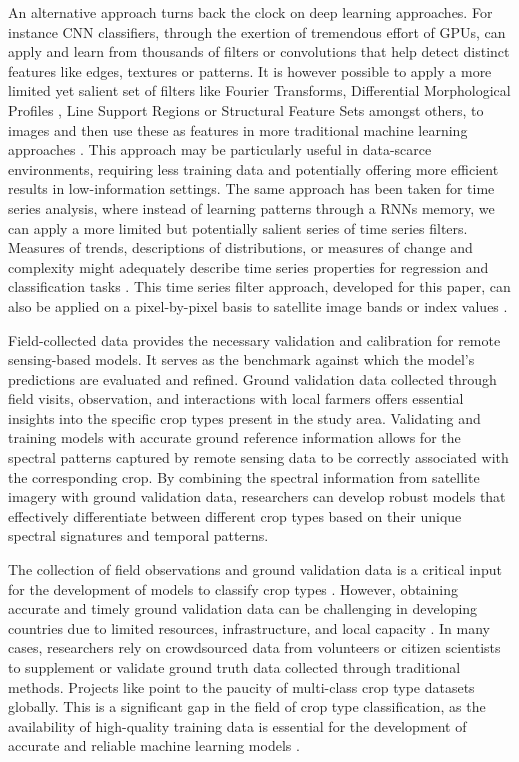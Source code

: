 \documentclass[journal]{IEEEtran}
\begin{document}
An alternative approach turns back the clock on deep learning approaches. For instance CNN classifiers, through the exertion of tremendous effort of GPUs, can apply and learn from thousands of filters or convolutions that help detect distinct features like edges, textures or patterns. It is however possible to apply a more limited yet salient set of filters like Fourier Transforms, Differential Morphological Profiles \cite{pesaresi2001new}, Line Support Regions or Structural Feature Sets \cite{huang2007classification} amongst others, to images and then use these as features in more traditional machine learning approaches \cite{graesser2012image, owusu2024towards, engstrom2022poverty, chao2021evaluating, urbansci7040116}. This approach may be particularly useful in data-scarce environments, requiring less training data and potentially offering more efficient results in low-information settings. The same approach has been taken for time series analysis, where instead of learning patterns through a RNNs memory, we can apply a more limited but potentially salient series of time series filters. Measures of trends, descriptions of distributions, or measures of change and complexity might adequately describe time series properties for regression and classification tasks \cite{christ2018time, yang2021anomaly}. This time series filter approach, developed for this paper, can also be applied on a pixel-by-pixel basis to satellite image bands or index values \cite{xr_fresh_2021}.

Field-collected data provides the necessary validation and calibration for remote sensing-based models. It serves as the benchmark against which the model's predictions are evaluated and refined. Ground validation data collected through field visits, observation, and interactions with local farmers offers essential insights into the specific crop types present in the study area. Validating and training models with accurate ground reference information allows for the spectral patterns captured by remote sensing data to be correctly associated with the corresponding crop. By combining the spectral information from satellite imagery with ground validation data, researchers can develop robust models that effectively differentiate between different crop types based on their unique spectral signatures and temporal patterns.

The collection of field observations and ground validation data is a critical input for the development of models to classify crop types \cite{delince2017handbook, MA2019166}. However, obtaining accurate and timely ground validation data can be challenging in developing countries due to limited resources, infrastructure, and local capacity \cite{delince2017handbook, begue2018remote}. In many cases, researchers rely on crowdsourced data from volunteers or citizen scientists to supplement or validate ground truth data collected through traditional methods. Projects like \cite{tseng2021cropharvest} point to the paucity of multi-class crop type datasets globally. This is a significant gap in the field of crop type classification, as the availability of high-quality training data is essential for the development of accurate and reliable machine learning models \cite{rs13132591}.
 
\end{document}
